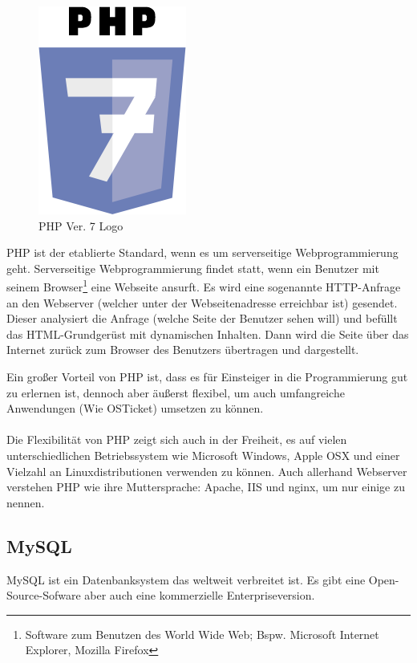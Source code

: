 	\begin{figure}[h]
		\centering
		\includegraphics[scale=.6]{figures/php_logo.png}
		\caption{PHP Ver. 7 Logo}
		\label{PHP_Logo}
	\end{figure}
	
	PHP ist der etablierte Standard, wenn es um serverseitige Webprogrammierung geht. Serverseitige Webprogrammierung findet statt, wenn ein Benutzer mit seinem Browser\footnote{Software zum Benutzen des World Wide Web; Bspw. Microsoft Internet Explorer, Mozilla Firefox} eine Webseite ansurft. Es wird eine sogenannte HTTP-Anfrage an den Webserver (welcher unter der Webseitenadresse erreichbar ist) gesendet. Dieser analysiert die Anfrage (welche Seite der Benutzer sehen will) und befüllt das HTML-Grundgerüst mit dynamischen Inhalten. Dann wird die Seite über das Internet zurück zum Browser des Benutzers übertragen und dargestellt.
	
	Ein großer Vorteil von PHP ist, dass es für Einsteiger in die Programmierung gut zu erlernen ist, dennoch aber äußerst flexibel, um auch umfangreiche Anwendungen (Wie OSTicket) umsetzen zu können.
	\paragraph{}
	Die Flexibilität von PHP zeigt sich auch in der Freiheit, es auf vielen unterschiedlichen Betriebssystem wie Microsoft Windows, Apple OSX und einer Vielzahl an Linuxdistributionen verwenden zu können. Auch allerhand Webserver verstehen PHP wie ihre Muttersprache: Apache, IIS und nginx, um nur einige zu nennen.
	
	\subsection{MySQL}
	MySQL ist ein Datenbanksystem das weltweit verbreitet ist. Es gibt eine Open-Source-Sofware aber auch eine kommerzielle Enterpriseversion.
	
